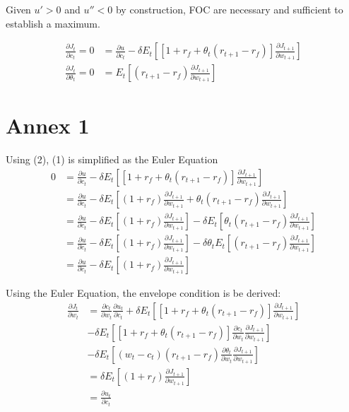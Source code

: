\documentclass[]{article}
\begin{document}
Given $u'>0$ and $u''<0$ by construction, FOC are necessary and sufficient to establish a maximum.

\begin{align}
	\frac{\partial J_t}{\partial c_t} = 0 &= \frac{\partial u}{\partial c_t} - \delta E_t \left[\left[1 + r_f + \theta_t(r_{t+1}-r_f) \right]\frac{\partial J_{t+1}}{\partial w_{t+1}}\right]\\
	\frac{\partial J_t}{\partial \theta_t} = 0 &= E_t \left[(r_{t+1}-r_f) \frac{\partial J_{t+1}}{\partial w_{t+1}} \right]
\end{align}

\section{Annex 1}

Using (2), (1) is simplified as the Euler Equation
\begin{align*}
	0 &= \frac{\partial u}{\partial c_t} - \delta E_t \left[\left[1 + r_f + \theta_t(r_{t+1}-r_f) \right]\frac{\partial J_{t+1}}{\partial w_{t+1}}\right]\\
	&= \frac{\partial u}{\partial c_t} - \delta E_t \left[(1 + r_f) \frac{\partial J_{t+1}}{\partial w_{t+1}} + \theta_t(r_{t+1}-r_f) \frac{\partial J_{t+1}}{\partial w_{t+1}}\right] \\
	&= \frac{\partial u}{\partial c_t} - \delta E_t \left[(1 + r_f)\frac{\partial J_{t+1}}{\partial w_{t+1}} \right] - \delta E_t \left[ \theta_t(r_{t+1}-r_f) \frac{\partial J_{t+1}}{\partial w_{t+1}}\right] \\
	&= \frac{\partial u}{\partial c_t} - \delta E_t \left[(1 + r_f)\frac{\partial J_{t+1}}{\partial w_{t+1}} \right] - \delta \theta_t E_t \left[(r_{t+1}-r_f) \frac{\partial J_{t+1}}{\partial w_{t+1}}\right] \\
	&= \frac{\partial u}{\partial c_t} - \delta E_t \left[(1 + r_f)\frac{\partial J_{t+1}}{\partial w_{t+1}} \right]
\end{align*}

Using the Euler Equation, the envelope condition is be derived:
\begin{align*}
	\frac{\partial J_t}{\partial w_t} &= \frac{\partial c_t}{\partial w_t} \frac{\partial u_t}{\partial c_t} + \delta E_t \left[\left[1 + r_f + \theta_t(r_{t+1}-r_f) \right]\frac{\partial J_{t+1}}{\partial w_{t+1}}\right]\\
	&- \delta E_t \left[\left[1 + r_f + \theta_t(r_{t+1}-r_f) \right]\frac{\partial c_t}{\partial w_t}\frac{\partial J_{t+1}}{\partial w_{t+1}}\right]\\
	&- \delta E_t\left[(w_t - c_t)(r_{t+1}-r_f)\frac{\partial \theta_t}{\partial w_t}\frac{\partial J_{t+1}}{\partial w_{t+1}}\right]\\
	&= \delta E_t \left[(1 + r_f)\frac{\partial J_{t+1}}{\partial w_{t+1}} \right]\\
	&= \frac{\partial u_t}{\partial c_t}
\end{align*}
\end{document}
